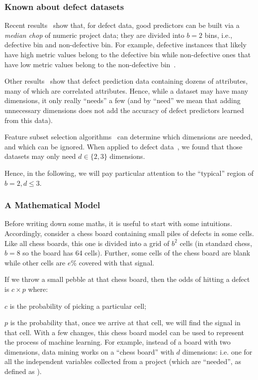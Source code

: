 \subsubsection{Known about defect datasets}\label{sect:data}

Recent
results~\cite{Zhang14,nam2015clami} show that, for defect data, good
predictors can be built via a {\em median chop} of
numeric project data;
they are divided into $b=2$ bins, i.e., defective bin and non-defective bin. For example, defective instances that likely have high metric values belong to the defective bin while non-defective ones that have low metric values belong to the non-defective bin~\cite{nam2015clami}.

Other results~\cite{shepperd94}
show that defect prediction data containing dozens
of attributes, many of which are correlated
attributes. Hence, while a dataset may have many dimensions, it only really ``needs'' a few
(and by ``need'' we mean that adding unnecessary dimensions does not add the accuracy
of defect predictors learned from this data).


Feature subset selection algorithms~\cite{Hall03} can  determine
which  dimensions are needed, and which can be ignored.
When applied to defect data~\cite{Menzies07},
we found that those datasets may only need  $d \in \{2,3\}$
dimensions.

Hence, in the following, we will pay particular attention to the ``typical'' region of
 $b=2, d \le 3$.

\subsubsection{A Mathematical Model}

Before writing down some maths, it is useful to start with some intuitions.
Accordingly, consider a chess board  containing small  piles of defects in some cells.
Like all chess boards, this one is  divided into a grid of $b^2$ cells (in standard chess, $b=8$ so the board has 64 cells).
Further, some cells of the chess board are blank while other cells are $e$\% covered
with that signal.

If we throw a small pebble at that chess board, then  the odds
of hitting a defect is $c \times p$ where:
\squishlist
\item $c$ is the probability of picking a particular cell;
\item $p$ is the probability that, once we arrive at that cell, we will find  the  signal in that cell.
\squishend
With a few changes, this chess board model can be
used to represent the process of machine
learning. For example,
instead of a board with two
dimensions, data mining works on a ``chess board''
with $d$ dimensions: i.e. one for all the independent
variables collected from a project (which are ``needed'', as defined as ).

